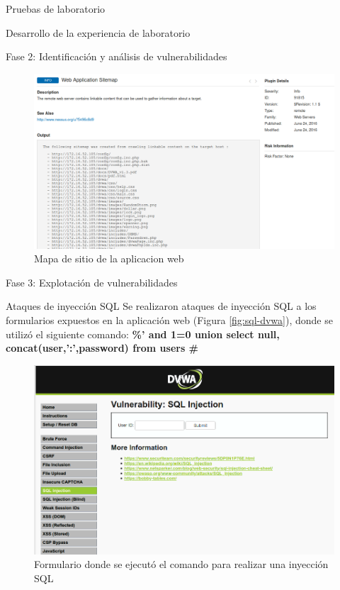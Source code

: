 \begin{section}{Pruebas de laboratorio}
\begin{subsection}{Desarrollo de la experiencia de laboratorio}
\begin{subsubsection} {Fase 2: Identificación y análisis de vulnerabilidades}
    \begin{figure}[H]
    \centering
    \includegraphics[width=1\textwidth]{./iteracion_3_imagenes/nessus-e-4.png}
    \caption{Mapa de sitio de la aplicacion web}
    \label{fig:nessus-e-4}
    \end{figure}
    \FloatBarrier 
    \end{subsubsection}
    \begin{subsubsection}{Fase 3: Explotación de vulnerabilidades}
    \end{subsubsection}
    \begin{subsubsection}{Ataques de inyección SQL}
    Se realizaron ataques de inyección SQL a los formularios expuestos en la aplicación web (Figura \ref{fig:sql-dvwa}), donde se utilizó el siguiente comando: \textbf{\%' and 1=0 union select null, concat(user,':',password) from users \#}
    \begin{figure}[H]
    \centering
    \includegraphics[width=1\textwidth]{./iteracion_3_imagenes/sql-dvwa.png}
    \caption{Formulario donde se ejecutó el comando para realizar una inyección SQL}

\end{figure}
\end{subsubsection}
\end{subsection}
\end{section}
